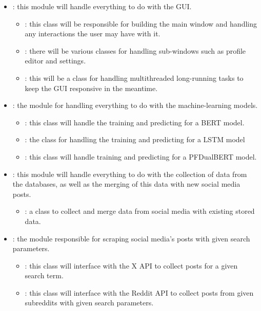     \begin{itemize}
        \item {}: this module will handle everything to do with the GUI.
        \begin{itemize}
            \item {}: this class will be responsible for building the main window and handling any interactions the user may have with it.
            \item {}: there will be various classes for handling sub-windows such as profile editor and settings.
            \item {}: this will be a class for handling multithreaded long-running tasks to keep the GUI responsive in the meantime.
        \end{itemize}
        \item {}: the module for handling everything to do with the machine-learning models.
        \begin{itemize}
            \item {}: this class will handle the training and predicting for a BERT model.
            \item {}: the class for handling the training and predicting for a LSTM model
            \item {}: this class will handle training and predicting for a PFDualBERT model. 
        \end{itemize}
        \item {}: this module will handle everything to do with the collection of data from the databases, as well as the merging of this data with new social media posts.
        \begin{itemize}
            \item {}: a class to collect and merge data from social media with existing stored data.
        \end{itemize}
        \item {}: the module responsible for scraping social media's posts with given search parameters.
        \begin{itemize}
            \item {}: this class will interface with the X API to collect posts for a given search term.
            \item {}: this class will interface with the Reddit API to collect posts from given subreddits with given search parameters.
        \end{itemize}
    \end{itemize}

